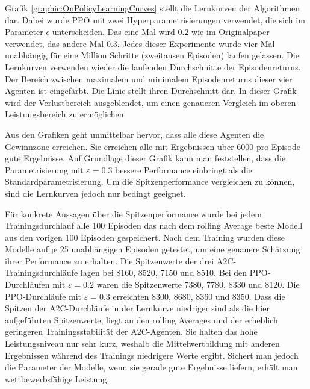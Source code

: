 Grafik \ref{graphic:OnPolicyLearningCurves} stellt die Lernkurven der Algorithmen dar.
Dabei wurde PPO mit zwei Hyperparametrisierungen verwendet, die sich im Parameter $\epsilon$ unterscheiden.
Das eine Mal wird $0.2$ wie im Originalpaper verwendet, das andere Mal $0.3$.
Jedes dieser Experimente wurde vier Mal unabhängig für eine Million Schritte (zweitausen Episoden) laufen gelassen.
Die Lernkurven verwenden wieder die laufenden Durchschnitte der Episodenreturns.
Der Bereich zwischen maximalem und minimalem Episodenreturns dieser vier Agenten ist eingefärbt.
Die Linie stellt ihren Durchschnitt dar.
In dieser Grafik wird der Verlustbereich ausgeblendet, um einen genaueren Vergleich im oberen Leistungsbereich zu ermöglichen.

Aus den Grafiken geht unmittelbar hervor, dass alle diese Agenten die Gewinnzone erreichen.
Sie erreichen alle mit Ergebnissen über 6000 pro Episode gute Ergebnisse.
Auf Grundlage dieser Grafik kann man feststellen, dass die Parametrisierung mit $\varepsilon=0.3$ bessere Performance einbringt als die Standardparametrisierung.
Um die Spitzenperformance vergleichen zu können, sind die Lernkurven jedoch nur bedingt geeignet.

Für konkrete Aussagen über die Spitzenperformance wurde bei jedem Trainingsdurchlauf alle 100 Episoden das nach dem rolling Average beste Modell aus den vorigen 100 Episoden gespeichert.
Nach dem Training wurden diese Modelle auf je 25 unabhängigen Episoden getestet, um eine genauere Schätzung ihrer Performance zu erhalten.
Die Spitzenwerte der drei A2C-Trainingsdurchläufe lagen bei 8160, 8520, 7150 und 8510.
Bei den PPO-Durchläufen mit $\varepsilon=0.2$ waren die Spitzenwerte 7380, 7780, 8330 und 8120.
Die PPO-Durchläufe mit $\varepsilon=0.3$ erreichten 8300, 8680, 8360 und 8350.
Dass die Spitzen der A2C-Durchläufe in der Lernkurve niedriger sind als die hier aufgeführten Spitzenwerte, liegt an den rolling Averages und der erheblich geringeren Trainingsstabilität der A2C-Agenten.
Sie halten das hohe Leistungsniveau nur sehr kurz, weshalb die Mittelwertbildung mit anderen Ergebnissen während des Trainings niedrigere Werte ergibt.
Sichert man jedoch die Parameter der Modelle, wenn sie gerade gute Ergebnisse liefern, erhält man wettbewerbsfähige Leistung.

